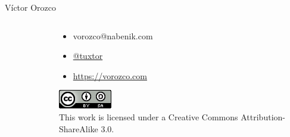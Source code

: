 \documentclass[aspectratio=169]{beamer}
\begin{document}
\begin{frame}{Víctor Orozco}
\begin{columns}[T]
\begin{column}[T]{4cm}
\begin{figure}
		\end{figure}
	\end{column}
	\begin{column}[T]{6cm} %
		\begin{itemize}
			\item vorozco@nabenik.com
			\item \href{https://twitter.com/tuxtor}{@tuxtor}
			\item \href{http://www.nabenik.com}{https://vorozco.com}
		\end{itemize}
	\begin{center}
		\includegraphics[width=0.1\linewidth]{Images/cclogo}
		\\
		This work is licensed under a Creative Commons Attribution-ShareAlike 3.0.
	\end{center}
	\end{column}
\end{columns}
\end{frame}
\end{document}
